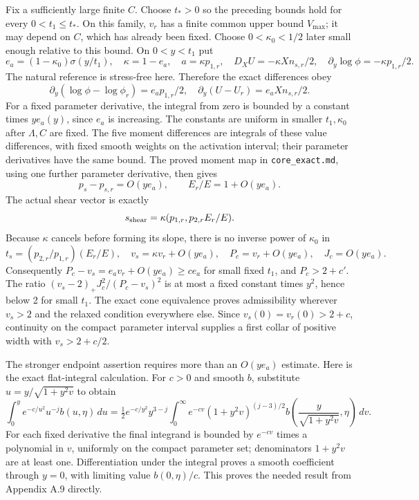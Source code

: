 \documentclass[10pt,a4paper]{article}
\begin{document}
Fix a sufficiently large finite \(C\). Choose \(t_*>0\) so the preceding bounds hold for every \(0<t_1\le t_*\). On this family, \(v_r\) has a finite common upper bound \(V_{\max}\); it may depend on \(C\), which has already been fixed. Choose \(0<\kappa_0<1/2\) later small enough relative to this bound. On \(0<y<t_1\) put
\[
e_a=(1-\kappa_0)\sigma(y/t_1),\quad\kappa=1-e_a,
\quad a=\kappa p_{1,r},\quad D_XU=-\kappa Xn_{s,r}/2,
\quad \partial_y\log\phi=-\kappa p_{1,r}/2.
\]
The natural reference is stress-free here. Therefore the exact differences obey
\[
\partial_y(\log\phi-\log\phi_r)=e_ap_{1,r}/2,
\quad \partial_y(U-U_r)=e_aXn_{s,r}/2.
\]
For a fixed parameter derivative, the integral from zero is bounded by a constant times \(ye_a(y)\), since \(e_a\) is increasing. The constants are uniform in smaller \(t_1,\kappa_0\) after \(\Lambda,C\) are fixed. The five moment differences are integrals of these value differences, with fixed smooth weights on the activation interval; their parameter derivatives have the same bound. The proved moment map in \texttt{core\_exact.md}, using one further parameter derivative, then gives
\[
p_s-p_{s,r}=O(ye_a),\qquad E_r/E=1+O(ye_a).
\]
The actual shear vector is exactly
\[
s_{\rm shear}=\kappa(p_{1,r},p_{2,r}E_r/E).
\]
Because \(\kappa\) cancels before forming its slope, there is no inverse power of \(\kappa_0\) in
\[
t_s=(p_{2,r}/p_{1,r})(E_r/E),\quad
v_s=\kappa v_r+O(ye_a),\quad P_c=v_r+O(ye_a),\quad J_c=O(ye_a).
\]
Consequently \(P_c-v_s=e_av_r+O(ye_a)\ge ce_a\) for small fixed \(t_1\), and \(P_c>2+c'\). The ratio
\((v_s-2)_+J_c^2/(P_c-v_s)^2\) is at most a fixed constant times \(y^2\), hence below 2 for small \(t_1\). The exact cone equivalence proves admissibility wherever \(v_s>2\) and the relaxed condition everywhere else. Since \(v_s(0)=v_r(0)>2+c\), continuity on the compact parameter interval supplies a first collar of positive width with \(v_s>2+c/2\).

The stronger endpoint assertion requires more than an \(O(ye_a)\) estimate. Here is the exact flat-integral calculation. For \(c>0\) and smooth \(b\), substitute \(u=y/\sqrt{1+y^2v}\) to obtain
\[
\int_0^y e^{-c/u^2}u^{-j}b(u,\eta)\,du
=\tfrac12e^{-c/y^2}y^{3-j}
\int_0^\infty e^{-cv}(1+y^2v)^{(j-3)/2}
b\left(\frac y{\sqrt{1+y^2v}},\eta\right)\,dv.
\]
For each fixed derivative the final integrand is bounded by \(e^{-cv}\) times a polynomial in \(v\), uniformly on the compact parameter set; denominators \(1+y^2v\) are at least one. Differentiation under the integral proves a smooth coefficient through \(y=0\), with limiting value \(b(0,\eta)/c\). This proves the needed result from Appendix A.9 directly.
\end{document}
